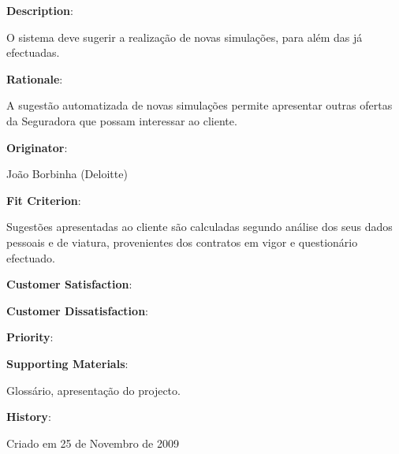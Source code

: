 \begin{description}
\item \textbf{Description}:

O sistema deve sugerir a realização de novas simulações, para além das já efectuadas.\\

\item \textbf{Rationale}:

A sugestão automatizada de novas simulações permite apresentar outras ofertas da Seguradora que possam interessar ao cliente.\\

\item \textbf{Originator}:

João Borbinha (Deloitte)\\

\item \textbf{Fit Criterion}:

Sugestões apresentadas ao cliente são calculadas segundo análise dos seus dados pessoais e de viatura, provenientes dos contratos em vigor e questionário efectuado.\\

\begin{minipage}{0.45\textwidth}
\begin{flushleft}\item \textbf{Customer Satisfaction}:\end{flushleft}
\end{minipage}
\begin{minipage}{0.45\textwidth}
\begin{flushleft}\item \textbf{Customer Dissatisfaction}:\end{flushleft}
\end{minipage}

\item \textbf{Priority}:\\

\item \textbf{Supporting Materials}:

Glossário, apresentação do projecto.\\

\item \textbf{History}:

Criado em 25 de Novembro de 2009\\
\end{description}

\pagebreak

